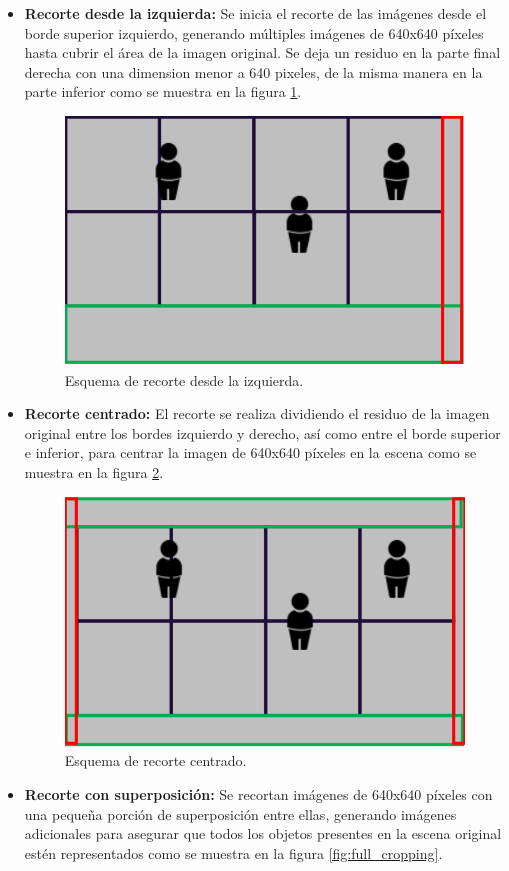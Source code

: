 \begin{itemize}
  \item \textbf{Recorte desde la izquierda:} Se inicia el recorte de las imágenes desde el borde superior izquierdo, generando múltiples imágenes de 640x640 píxeles hasta cubrir el área de la imagen original. Se deja un residuo en la parte final derecha con una dimension menor a 640 pixeles, de la misma manera en la parte inferior como se muestra en la figura \ref{fig:left_cropping}.

\begin{figure}[!ht]
  \centering
  \includegraphics[width=.49\linewidth]{images/left_cropping.png}
  \caption{Esquema de recorte desde la izquierda.}
  \label{fig:left_cropping}
\end{figure}

\item \textbf{Recorte centrado:} El recorte se realiza dividiendo el residuo de la imagen original entre los bordes izquierdo y derecho, así como entre el borde superior e inferior, para centrar la imagen de 640x640 píxeles en la escena como se muestra en la figura \ref{fig:center_cropping}.

\begin{figure}[!ht]
  \centering
  \includegraphics[width=.49\linewidth]{images/center_cropping.png}
  \caption{Esquema de recorte centrado.}
  \label{fig:center_cropping}
\end{figure}

\item \textbf{Recorte con superposición:} Se recortan imágenes de 640x640 píxeles con una pequeña porción de superposición entre ellas, generando imágenes adicionales para asegurar que todos los objetos presentes en la escena original estén representados como se muestra en la figura \ref{fig:full_cropping}.


\end{itemize}
